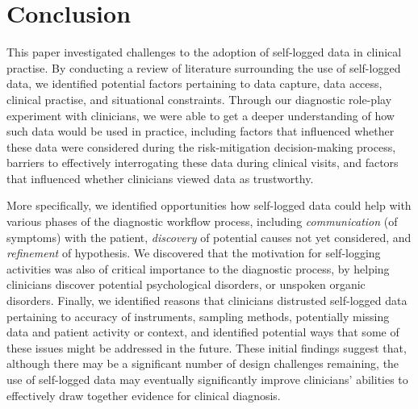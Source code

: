 \documentclass{sigchi}
\begin{document}
\section{Conclusion}






This paper investigated challenges to the adoption of self-logged data in clinical practise. By conducting a review of literature surrounding the use of self-logged data, we identified potential factors pertaining to data capture, data access, clinical practise, and situational constraints.  Through our diagnostic role-play experiment with clinicians, we were able to get a deeper understanding of how such data would be used in practice, including factors that influenced whether these data were considered during the risk-mitigation decision-making process, barriers to effectively interrogating  these data during clinical visits, and factors that influenced whether clinicians viewed data as trustworthy. 

More specifically, we identified opportunities how self-logged data could help with various phases of the diagnostic workflow process, including \emph{communication} (of symptoms) with the patient,  \emph{discovery} of potential causes not yet considered, and \emph{refinement} of hypothesis.  We discovered that the motivation for self-logging activities was also of critical importance to the diagnostic process, by helping clinicians discover potential psychological disorders, or unspoken organic disorders. Finally, we identified reasons that clinicians distrusted self-logged data pertaining to accuracy of instruments, sampling methods, potentially missing data and patient activity or context, and identified potential ways that some of these issues might be addressed in the future. These initial findings suggest that, although there may be a significant number of design challenges remaining, the use of self-logged data may eventually significantly improve clinicians' abilities to effectively draw together evidence for clinical diagnosis. %
\end{document}
